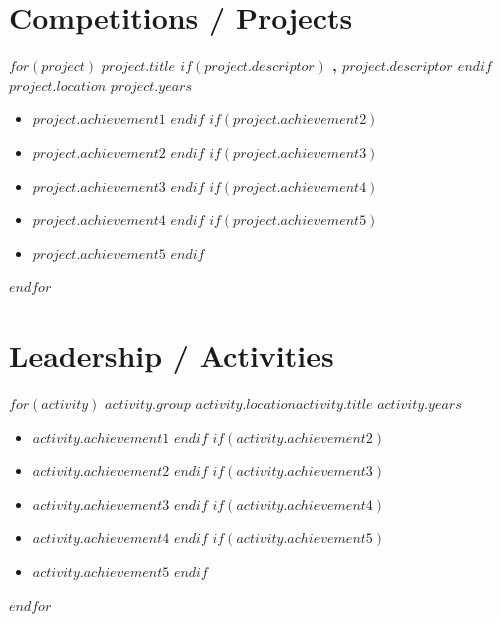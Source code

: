 \documentclass[11pt]{cv-class}
\begin{document}
\section{Competitions / Projects}
$for(project)$
    \noindent\textbf{$project.title$ $if(project.descriptor)$ \unskip, \textit{$project.descriptor$} $endif$}\quad \textit{$project.location$} \hfill {$project.years$}
    \begin{itemize}[noitemsep,nolistsep,leftmargin=*]
        $if(project.achievement1)$ \item \raggedright{$project.achievement1$} $endif$
        $if(project.achievement2)$ \item \raggedright{$project.achievement2$} $endif$
        $if(project.achievement3)$ \item \raggedright{$project.achievement3$} $endif$
        $if(project.achievement4)$ \item \raggedright{$project.achievement4$} $endif$
        $if(project.achievement5)$ \item \raggedright{$project.achievement5$} $endif$
    \end{itemize}
    \bigskip
$endfor$

\section{Leadership / Activities}
$for(activity)$
    \noindent\textbf{$activity.group$} \hfill {$activity.location$}\break\textit{$activity.title$} \hfill {$activity.years$}
    \begin{itemize}[noitemsep,nolistsep,leftmargin=*]
        $if(activity.achievement1)$ \item \raggedright{$activity.achievement1$} $endif$
        $if(activity.achievement2)$ \item \raggedright{$activity.achievement2$} $endif$
        $if(activity.achievement3)$ \item \raggedright{$activity.achievement3$} $endif$
        $if(activity.achievement4)$ \item \raggedright{$activity.achievement4$} $endif$
        $if(activity.achievement5)$ \item \raggedright{$activity.achievement5$} $endif$
    \end{itemize}
    \bigskip
$endfor$
\end{document}
